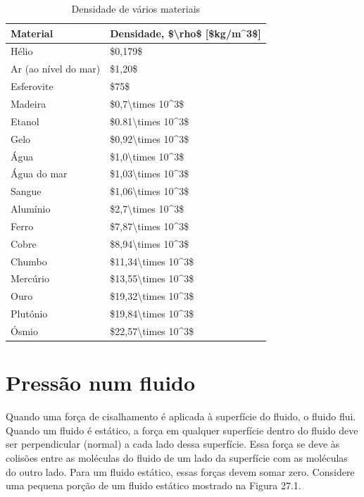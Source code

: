 \documentclass[
  portuguese,
  ]{book}
\begin{document}
\begin{table}

\caption{\label{tab:unnamed-chunk-4}Densidade de vários materiais}
\centering
\begin{tabular}[t]{l|l}
\hline
Material & Densidade, \$\textbackslash{}rho\$ [\$kg/m\textasciicircum{}3\$]\\
\hline
Hélio & \$0,179\$\\
\hline
Ar (ao nível do mar) & \$1,20\$\\
\hline
Esferovite & \$75\$\\
\hline
Madeira & \$0,7\textbackslash{}times 10\textasciicircum{}3\$\\
\hline
Etanol & \$0.81\textbackslash{}times 10\textasciicircum{}3\$\\
\hline
Gelo & \$0,92\textbackslash{}times 10\textasciicircum{}3\$\\
\hline
Água & \$1,0\textbackslash{}times 10\textasciicircum{}3\$\\
\hline
Água do mar & \$1,03\textbackslash{}times 10\textasciicircum{}3\$\\
\hline
Sangue & \$1,06\textbackslash{}times 10\textasciicircum{}3\$\\
\hline
Alumínio & \$2,7\textbackslash{}times 10\textasciicircum{}3\$\\
\hline
Ferro & \$7,87\textbackslash{}times 10\textasciicircum{}3\$\\
\hline
Cobre & \$8,94\textbackslash{}times 10\textasciicircum{}3\$\\
\hline
Chumbo & \$11,34\textbackslash{}times 10\textasciicircum{}3\$\\
\hline
Mercúrio & \$13,55\textbackslash{}times 10\textasciicircum{}3\$\\
\hline
Ouro & \$19,32\textbackslash{}times 10\textasciicircum{}3\$\\
\hline
Plutónio & \$19,84\textbackslash{}times 10\textasciicircum{}3\$\\
\hline
Ósmio & \$22,57\textbackslash{}times 10\textasciicircum{}3\$\\
\hline
\end{tabular}
\end{table}

\hypertarget{pressuxe3o-num-fluido}{%
\section{Pressão num fluido}\label{pressuxe3o-num-fluido}}

Quando uma força de cisalhamento é aplicada à superfície do fluido, o fluido flui. Quando um fluido é estático, a força em qualquer superfície dentro do fluido deve ser perpendicular (normal) a cada lado dessa superfície. Essa força se deve às colisões entre as moléculas do fluido de um lado da superfície com as moléculas do outro lado. Para um fluido estático, essas forças devem somar zero. Considere uma pequena porção de um fluido estático mostrado na Figura 27.1.
\end{document}
